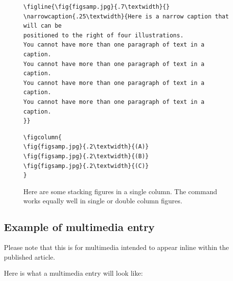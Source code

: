 \documentclass[reprint,NumberedRefs]{JASAnew}
\begin{document}
\begin{figure}
\baselineskip=12pt
\begin{verbatim}
\figline{\fig{figsamp.jpg}{.7\textwidth}{}
\narrowcaption{.25\textwidth}{Here is a narrow caption that will can be
positioned to the right of four illustrations.
You cannot have more than one paragraph of text in a caption.
You cannot have more than one paragraph of text in a caption.
You cannot have more than one paragraph of text in a caption.
You cannot have more than one paragraph of text in a caption.
}}
\end{verbatim}
\end{figure}
\clearpage

\begin{figure}[h]
\baselineskip=12pt
\begin{verbatim}
\figcolumn{
\fig{figsamp.jpg}{.2\textwidth}{(A)}
\fig{figsamp.jpg}{.2\textwidth}{(B)}
\fig{figsamp.jpg}{.2\textwidth}{(C)}
}
\end{verbatim}


\caption{Here are some stacking figures in a single column. 
The {\tt\string\figcolumn\string{\string}} command works equally well in single
or double column figures.}
\end{figure}

\subsection{Example of multimedia entry}
Please note that this is for multimedia intended to appear inline
within the published article. 

Here is what a multimedia entry will look like:
\label{mmtest1}
\end{document}
